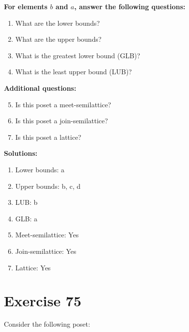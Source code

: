 \documentclass{article}
\begin{document}
    \textbf{For elements $b$ and $a$, answer the following questions:}
\begin{enumerate}
    \item What are the lower bounds?
    \item What are the upper bounds?
    \item What is the greatest lower bound (GLB)?
    \item What is the least upper bound (LUB)?
\end{enumerate}
    \hspace*{3ex} \textbf{Additional questions:}
\begin{enumerate}
    \setcounter{enumi}{4}
    \item Is this poset a meet-semilattice?
    \item Is this poset a join-semilattice?
    \item Is this poset a lattice?
\end{enumerate}

\textbf{Solutions:}
\begin{enumerate}
    \item Lower bounds: {a}
    \item Upper bounds: {b, c, d}
    \item LUB: b
    \item GLB: a
    \item Meet-semilattice: Yes
    \item Join-semilattice: Yes
    \item Lattice: Yes
\end{enumerate}
\newpage
\section*{Exercise 75}
Consider the following poset:
\begin{center}
\end{center}
\end{document}

